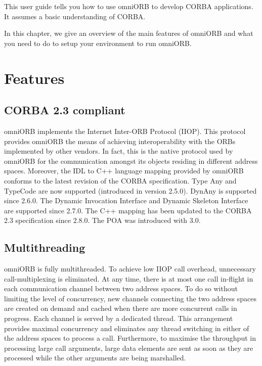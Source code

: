 \documentclass[11pt,twoside,a4paper]{book}
\begin{document}
This user guide tells you how to use omniORB to develop CORBA
applications. It assumes a basic understanding of CORBA.

In this chapter, we give an overview of the main features of omniORB
and what you need to do to setup your environment to run omniORB.

\section{Features}

\subsection{CORBA 2.3 compliant}

omniORB implements the Internet Inter-ORB Protocol (IIOP).  This
protocol provides omniORB the means of achieving interoperability with
the ORBs implemented by other vendors. In fact, this is the native
protocol used by omniORB for the communication amongst its objects
residing in different address spaces. Moreover, the IDL to C++
language mapping provided by omniORB conforms to the latest revision
of the CORBA specification. Type Any and TypeCode are now supported
(introduced in version 2.5.0). DynAny is supported since 2.6.0. The
Dynamic Invocation Interface and Dynamic Skeleton Interface are
supported since 2.7.0. The C++ mapping has been updated to the CORBA
2.3 specification since 2.8.0. The POA was introduced with 3.0.


\subsection{Multithreading}

omniORB is fully multithreaded. To achieve low IIOP call overhead,
unnecessary call-multiplexing is eliminated. At any time, there is at
most one call in-flight in each communication channel between two
address spaces. To do so without limiting the level of concurrency,
new channels connecting the two address spaces are created on demand
and cached when there are more concurrent calls in progress. Each
channel is served by a dedicated thread. This arrangement provides
maximal concurrency and eliminates any thread switching in either of
the address spaces to process a call. Furthermore, to maximise the
throughput in processing large call arguments, large data elements are
sent as soon as they are processed while the other arguments are being
marshalled.
\end{document}
